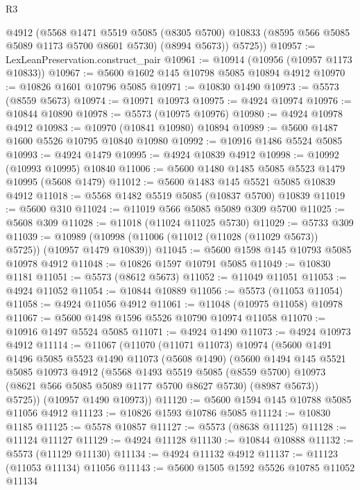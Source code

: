 \begin{lexlean}{R3}
\begin{coremodule}
        @4912
        (@5568
          @1471
          @5519
          @5085
          (@8305 @5700)
          @10833
          (@8595 @566 @5085 @5089 @1173 @5700 @8601 @5730)
          (@8994 @5673))
        @5725))
@10957 := LexLeanPreservation.construct_pair
@10961 := @10914 (@10956 (@10957 @1173 @10833))
@10967 := @5600 @1602 @145 @10798 @5085 @10894 @4912
@10970 := @10826 @1601 @10796 @5085
@10971 := @10830 @1490
@10973 := @5573 (@8559 @5673)
@10974 := @10971 @10973
@10975 := @4924 @10974
@10976 := @10844 @10890
@10978 := @5573 (@10975 @10976)
@10980 := @4924 @10978 @4912
@10983 := @10970 (@10841 @10980) @10894
@10989 := @5600 @1487 @1600 @5526 @10795 @10840 @10980
@10992 := @10916 @1486 @5524 @5085
@10993 := @4924 @1479
@10995 := @4924 @10839 @4912
@10998 := @10992 (@10993 @10995) @10840
@11006 := @5600 @1480 @1485 @5085 @5523 @1479 @10995 (@5608 @1479)
@11012 := @5600 @1483 @145 @5521 @5085 @10839 @4912
@11018 := @5568 @1482 @5519 @5085 (@10837 @5700) @10839
@11019 := @5600 @310
@11024 := @11019 @566 @5085 @5089 @309 @5700
@11025 := @5608 @309
@11028 := @11018 (@11024 @11025 @5730)
@11029 := @5733 @309
@11039 := @10989 (@10998 (@11006 (@11012 (@11028 (@11029 @5673)) @5725)) (@10957 @1479 @10839))
@11045 := @5600 @1598 @145 @10793 @5085 @10978 @4912
@11048 := @10826 @1597 @10791 @5085
@11049 := @10830 @1181
@11051 := @5573 (@8612 @5673)
@11052 := @11049 @11051
@11053 := @4924 @11052
@11054 := @10844 @10889
@11056 := @5573 (@11053 @11054)
@11058 := @4924 @11056 @4912
@11061 := @11048 (@10975 @11058) @10978
@11067 := @5600 @1498 @1596 @5526 @10790 @10974 @11058
@11070 := @10916 @1497 @5524 @5085
@11071 := @4924 @1490
@11073 := @4924 @10973 @4912
@11114 := @11067
    (@11070
      (@11071 @11073)
      @10974
      (@5600
        @1491
        @1496
        @5085
        @5523
        @1490
        @11073
        (@5608 @1490)
        (@5600
          @1494
          @145
          @5521
          @5085
          @10973
          @4912
          (@5568
            @1493
            @5519
            @5085
            (@8559 @5700)
            @10973
            (@8621 @566 @5085 @5089 @1177 @5700 @8627 @5730)
            (@8987 @5673))
          @5725))
      (@10957 @1490 @10973))
@11120 := @5600 @1594 @145 @10788 @5085 @11056 @4912
@11123 := @10826 @1593 @10786 @5085
@11124 := @10830 @1185
@11125 := @5578 @10857
@11127 := @5573 (@8638 @11125)
@11128 := @11124 @11127
@11129 := @4924 @11128
@11130 := @10844 @10888
@11132 := @5573 (@11129 @11130)
@11134 := @4924 @11132 @4912
@11137 := @11123 (@11053 @11134) @11056
@11143 := @5600 @1505 @1592 @5526 @10785 @11052 @11134

\end{coremodule}
\end{lexlean}
